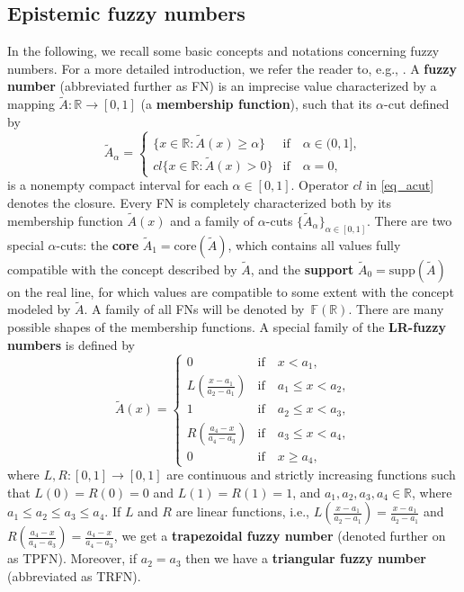\subsection{Epistemic fuzzy numbers}
In the following, we recall some basic concepts and notations concerning fuzzy numbers. For a more detailed introduction, we refer the reader to, e.g., \cite{ban_coroianu_pg}.
A \textbf{fuzzy number} (abbreviated further as FN) is an imprecise value characterized by a mapping $\tilde{A}:\mathbb{R}\to [0,1]$ (a \textbf{membership function}), such that its $\alpha$-cut defined by
\begin{equation}
\tilde{A}_{\alpha}=\begin{cases}
\{x\in\mathbb{R}:\tilde{A}(x)\geqslant\alpha\} & \text{if}\quad \alpha\in (0,1], \\
cl\{x\in\mathbb{R}:\tilde{A}(x)>0\} & \text{if}\quad \alpha=0,
\end{cases} \label{eq_acut}
\end{equation}
is a nonempty compact interval for each $\alpha\in [0,1]$. Operator $cl$ in \eqref{eq_acut} denotes the closure. Every FN is completely characterized both by its membership function $\tilde{A}(x)$ and a family of $\alpha$-cuts $\{\tilde{A}_{\alpha}\}_{\alpha\in [0,1]}$. There are two special $\alpha$-cuts: the \textbf{core} $\tilde{A}_1=\mathrm{core}(\tilde{A})$, which contains all values fully compatible with the concept described by $\tilde{A}$, and the \textbf{support} $\tilde{A}_0=\mathrm{supp}(\tilde{A})$ on the real line, for which values are compatible to some extent with the concept modeled by $\tilde{A}$. A family of all FNs will be denoted by~$\mathbb{F}(\mathbb{R})$.
There are many possible shapes of the membership functions.
A special family of the \textbf{LR-fuzzy numbers} is defined by
\begin{equation} 
\tilde{A}(x)=
\begin{cases}
0 & \text{if}\quad x < a_1,  \\
L \left( \frac{x-a_1}{a_2 - a_1}\right) & \text{if}\quad a_1 \leqslant x < a_2 ,  \\
1 & \text{if}\quad a_2 \leqslant x < a_3 , \\
R \left( \frac{a_4 - x}{a_4 - a_3}\right) & \text{if}\quad a_3 \leqslant x < a_4 , \\
0 & \text{if}\quad x \geqslant a_4,  
\end{cases}
\label{eq:LFfn}
\end{equation} 
where $L, R: [0,1] \rightarrow [0,1]$ are continuous and strictly increasing functions such that $L(0)=R(0)=0$ and $L(1)=R(1)=1$, and $a_1,a_2,a_3,a_4\in\mathbb{R}$, where $a_1\leqslant a_2\leqslant a_3\leqslant a_4$. If $L$ and $R$ are linear functions, i.e., $L \left( \frac{x-a_1}{a_2 - a_1}\right) = \frac{x-a_1}{a_2 - a_1}$ and $R \left( \frac{a_4 - x}{a_4 - a_3}\right) = \frac{a_4 - x}{a_4 - a_3}$, we get a \textbf{trapezoidal fuzzy number} (denoted further on as TPFN). Moreover, if $a_2=a_3$ then we have a \textbf{triangular fuzzy number} (abbreviated as TRFN).
